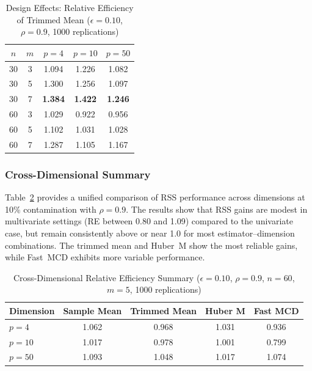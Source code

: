 \documentclass[12pt]{article}
\begin{document}
\begin{table}[htbp]
\centering
\caption{Design Effects: Relative Efficiency of Trimmed Mean ($\epsilon = 0.10$, $\rho = 0.9$, 1000 replications)}
\label{tab:design_effects_all}
\begin{tabular}{cc|ccc}
\toprule
$n$ & $m$ & $p = 4$ & $p = 10$ & $p = 50$ \\
\midrule
30 & 3 & 1.094 & 1.226 & 1.082 \\
30 & 5 & 1.300 & 1.256 & 1.097 \\
30 & 7 & \textbf{1.384} & \textbf{1.422} & \textbf{1.246} \\
60 & 3 & 1.029 & 0.922 & 0.956 \\
60 & 5 & 1.102 & 1.031 & 1.028 \\
60 & 7 & 1.287 & 1.105 & 1.167 \\
\bottomrule
\end{tabular}
\end{table}

\subsubsection{Cross-Dimensional Summary}

Table~\ref{tab:cross_dim_summary} provides a unified comparison of RSS performance across dimensions at 10\% contamination with $\rho = 0.9$. The results show that RSS gains are modest in multivariate settings (RE between 0.80 and 1.09) compared to the univariate case, but remain consistently above or near 1.0 for most estimator--dimension combinations. The trimmed mean and Huber~M show the most reliable gains, while Fast~MCD exhibits more variable performance.

\begin{table}[htbp]
\centering
\caption{Cross-Dimensional Relative Efficiency Summary ($\epsilon = 0.10$, $\rho = 0.9$, $n = 60$, $m = 5$, 1000 replications)}
\label{tab:cross_dim_summary}
\begin{tabular}{lcccc}
\toprule
Dimension & Sample Mean & Trimmed Mean & Huber M & Fast MCD \\
\midrule
$p = 4$ & 1.062 & 0.968 & 1.031 & 0.936 \\
$p = 10$ & 1.017 & 0.978 & 1.001 & 0.799 \\
$p = 50$ & 1.093 & 1.048 & 1.017 & 1.074 \\
\bottomrule
\end{tabular}
\end{table}
\end{document}
